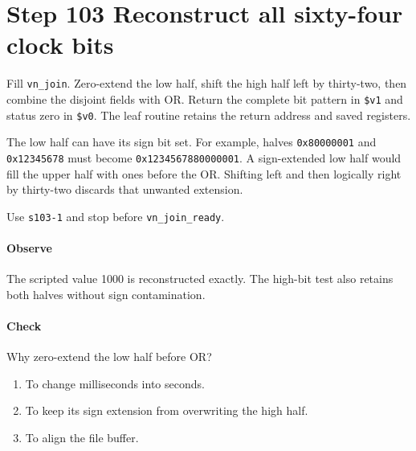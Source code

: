 \section{Step 103 Reconstruct all sixty-four clock bits}
Fill \texttt{vn\_join}. Zero-extend the low half, shift the high half left by thirty-two, then combine the disjoint fields with OR. Return the complete bit pattern in \texttt{\$v1} and status zero in \texttt{\$v0}. The leaf routine retains the return address and saved registers.

The low half can have its sign bit set. For example, halves \texttt{0x80000001} and \texttt{0x12345678} must become \texttt{0x1234567880000001}. A sign-extended low half would fill the upper half with ones before the OR. Shifting left and then logically right by thirty-two discards that unwanted extension.

Use \texttt{s103-1} and stop before \texttt{vn\_join\_ready}.

\paragraph{Observe} The scripted value 1000 is reconstructed exactly. The high-bit test also retains both halves without sign contamination.

\paragraph{Check} Why zero-extend the low half before OR?
\begin{enumerate}[label=\Alph*.]
\item To change milliseconds into seconds.
\item To keep its sign extension from overwriting the high half.
\item To align the file buffer.
\end{enumerate}
